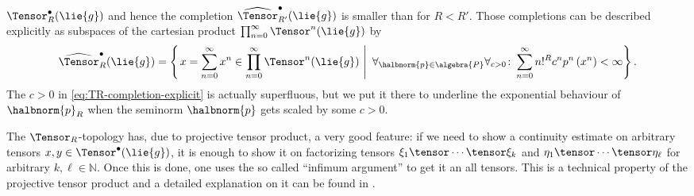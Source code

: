 \documentclass[
11pt,                          %
english                        %
]{article}
\begin{document}
$\Tensor_R^{\bullet}(\lie{g})$ and hence the completion 
$\widehat{\Tensor}_{R'}^{\bullet}(\lie{g})$ is smaller than for $R < R'$.
Those completions can be described explicitly as subspaces of the cartesian product 
$\prod_{n=0}^\infty \Tensor^n(\lie{g})$ by
\begin{equation}
	\label{eq:TR-completion-explicit}
	\widehat{\Tensor}_R^{\bullet}(\lie{g})
	=
	\left\{
	\left.
		x
		=
		\sum\limits_{n = 0}^\infty
		x^n
		\in
		\prod_{n=0}^\infty \Tensor^n(\lie{g})
	\ \right| \ 
		\forall_{\halbnorm{p} \in \algebra{P}}
		\forall_{c > 0}
		\colon
		\sum\limits_{n = 0}^\infty
		n!^R c^n p^n \left( x^n \right)
		<
		\infty
	\right\}.
\end{equation}
The $c > 0$ in \eqref{eq:TR-completion-explicit} is actually superfluous, but we put 
it there to underline the exponential behaviour of $\halbnorm{p}_R$ when the seminorm 
$\halbnorm{p}$ gets scaled by some $c > 0$.

The $\Tensor_R$-topology has, due to projective tensor product, a 
very good feature: if we need to show a continuity estimate on arbitrary tensors 
$x,y \in \Tensor^{\bullet}(\lie{g})$, it is enough to show it on factorizing tensors 
$\xi_1 \tensor \cdots \tensor \xi_k$ and $\eta_1 \tensor \cdots \tensor \eta_\ell$ 
for arbitrary $k, \ell \in \mathbb{N}$. Once this is done, one uses the so called 
``infimum argument'' to get it an all tensors. This is a technical property of the 
projective tensor product and a detailed explanation on it can be found in
\cite[Proposition 3.2]{esposito.stapor.waldmann:2015a:pre}.
\end{document}
